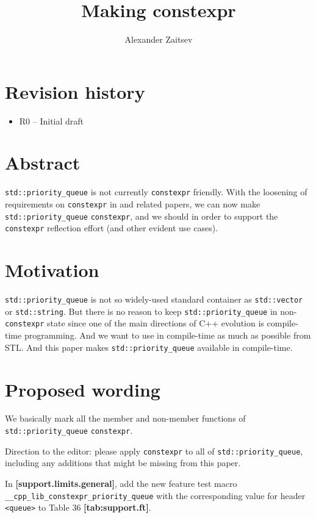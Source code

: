 \documentclass{wg21}
\title{Making \cc{std::priority_queue} constexpr}
\author{Alexander Zaitsev}{zamazan4ik@tut.by, zamazan4ik@gmail.com}
\newcommand{\cc}[1]{\texttt{#1}}
\begin{document}
\maketitle

\section{Revision history}
\begin{itemize}
  \item R0 -- Initial draft
\end{itemize}


\section{Abstract}
\cc{std::priority_queue} is not currently \cc{constexpr} friendly. With the loosening
of requirements on \cc{constexpr} in \cite{P0784R1} and related papers, we
can now make \cc{std::priority_queue} \cc{constexpr}, and we should in order to support
the \cc{constexpr} reflection effort (and other evident use cases).

\section{Motivation}
\cc{std::priority_queue} is not so widely-used standard container as \cc{std::vector} or \cc{std::string}. But there is no reason to keep \cc{std::priority_queue} in non-\cc{constexpr} state since one of the main directions of C++ evolution is compile-time programming. And we want to use in compile-time as much as possible from STL. And this paper makes \cc{std::priority_queue} available in compile-time.

\section{Proposed wording}
We basically mark all the member and non-member functions of \cc{std::priority_queue} \cc{constexpr}.

Direction to the editor: please apply \cc{constexpr} to all of \cc{std::priority_queue},
including any additions that might be missing from this paper.

In \textbf{[support.limits.general]}, add the new feature test macro
\cc{__cpp_lib_constexpr_priority_queue} with the corresponding value for header
\cc{<queue>} to Table 36 \textbf{[tab:support.ft]}.
\end{document}
